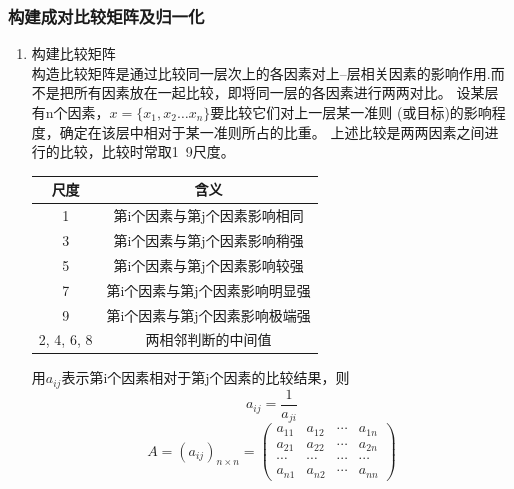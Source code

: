 \documentclass[a4paper, 12pt]{article}
\numberwithin{equation}{section}
\begin{document}
            \subsubsection{构建成对比较矩阵及归一化}
                \begin{enumerate}
                    \item 构建比较矩阵 \\
                        \qquad 构造比较矩阵是通过比较同一层次上的各因素对上–层相关因素的影响作用.而不是把所有因素放在一起比较，即将同一层的各因素进行两两对比。
                        设某层有n个因素，$ x = \{x_{1}, x_{2} \dots x_{n}\} $要比较它们对上一层某一准则 (或目标)的影响程度，确定在该层中相对于某一准则所占的比重。
                        上述比较是两两因素之间进行的比较，比较时常取1~9尺度。

                        \begin{table}[h]
                            \centering
                            \begin{tabular}{|c|c|} \hline
                                尺度 & 含义 \\ \hline
                                1 & 第i个因素与第j个因素影响相同 \\ \hline
                                3 & 第i个因素与第j个因素影响稍强 \\ \hline
                                5 & 第i个因素与第j个因素影响较强 \\ \hline
                                7 & 第i个因素与第j个因素影响明显强 \\ \hline
                                9 & 第i个因素与第j个因素影响极端强 \\ \hline
                                2, 4, 6, 8 & 两相邻判断的中间值 \\ \hline
                            \end{tabular}
                        \end{table}

                        用$ a_{ij} $表示第i个因素相对于第j个因素的比较结果，则
                        \[ a_{ij} = \frac{1}{a_{ji}} \]
                        \begin{equation}
                            A = (a_{ij})_{n \times n} =
                            \begin{pmatrix}
                                a_{11} & a_{12} & \cdots & a_{1n} \\
                                a_{21} & a_{22} & \cdots & a_{2n} \\
                                \cdots & \cdots & \cdots & \cdots \\
                                a_{n1} & a_{n2} & \cdots & a_{nn}
                            \end{pmatrix}
                        \end{equation}


\end{enumerate}
\end{document}
